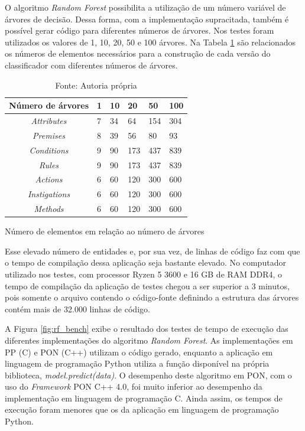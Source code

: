 O algoritmo \textit{Random Forest} possibilita a utilização de um número
variável de árvores de decisão. Dessa forma, com a implementação supracitada,
também é possível gerar código para diferentes números de árvores. Nos testes
foram utilizados os valores de 1, 10, 20, 50 e 100 árvores. Na Tabela
\ref{tab:elementos_arvores} são relacionados os números de elementos necessários
para a construção de cada versão do classificador com diferentes números de
árvores.

\begin{table}[!htb]
\centering
\label{tab:elementos_arvores}
\smallskip
\begin{tabularx}{0.8\textwidth}{|c|X|X|X|X|X|}
\hline
\textbf{Número de árvores} & 1 & 10 & 20 & 50 & 100\\
\hline
\hline
\textit{Attributes} & 7 & 34 & 64 & 154 & 304 \\
\hline
\textit{Premises} & 8 & 39 & 56 & 80 & 93 \\
\hline
\textit{Conditions} & 9 & 90 & 173 & 437 & 839 \\
\hline
\textit{Rules} & 9 & 90 & 173 & 437 & 839 \\
\hline
\textit{Actions} & 6 & 60 & 120 & 300 & 600 \\
\hline
\textit{Instigations} & 6 & 60 & 120 & 300 & 600 \\
\hline
\textit{Methods} & 6 & 60 & 120 & 300 & 600 \\
\hline
\end{tabularx}
\caption{Número de elementos em relação ao número de árvores}
\caption*{Fonte: Autoria própria}
\end{table}

Esse elevado número de entidades e, por sua vez, de linhas de código faz com que
o tempo de compilação dessa aplicação seja bastante elevado. No computador
utilizado nos testes, com processor Ryzen 5 3600 e 16 GB de RAM DDR4, o tempo de
compilação da aplicação de testes chegou a ser superior a 3 minutos, pois
somente o arquivo contendo o código-fonte definindo a estrutura das árvores
contém mais de 32.000 linhas de código.

A Figura \ref{fig:rf_bench} exibe o resultado dos testes de tempo de execução
das diferentes implementações do algoritmo \textit{Random Forest}. As
implementações em PP (C) e PON (C++) utilizam o código gerado, enquanto a
aplicação em linguagem de programação Python utiliza a função disponível na
própria biblioteca, \textit{model.predict(data)}. O desempenho deste algoritmo
em PON, com o uso do \textit{Framework} PON C++ 4.0, foi muito inferior ao
desempenho da implementação em linguagem de programação C. Ainda assim, os
tempos de execução foram menores que os da aplicação em linguagem de programação
Python.

